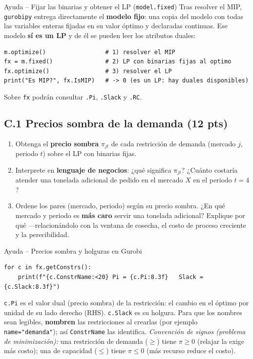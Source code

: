 \documentclass[12pt,a4paper]{article}
\begin{document}
\begin{ayuda}{Ayuda -- Fijar las binarias y obtener el LP (\texttt{model.fixed})}
\vspace{2pt}
Tras resolver el MIP, \texttt{gurobipy} entrega directamente el \textbf{modelo
fijo}: una copia del modelo con todas las variables enteras fijadas en su valor
óptimo y declaradas continuas. Ese modelo \textbf{sí es un LP} y de él se pueden
leer los atributos duales:
\begin{lstlisting}
m.optimize()                 # 1) resolver el MIP
fx = m.fixed()               # 2) LP con binarias fijas al optimo
fx.optimize()                # 3) resolver el LP
print("Es MIP?", fx.IsMIP)   # -> 0 (es un LP: hay duales disponibles)
\end{lstlisting}
Sobre \texttt{fx} podrán consultar \texttt{.Pi}, \texttt{.Slack} y \texttt{.RC}.
\end{ayuda}

\subsection*{C.1 \quad Precios sombra de la demanda \hfill\normalfont\normalsize(12 pts)}

\begin{enumerate}[label=\alph*), leftmargin=*, topsep=2pt]
    \item Obtenga el \textbf{precio sombra} $\pi_{jt}$ de cada restricción de
          demanda (mercado $j$, periodo $t$) sobre el LP con binarias fijas.
    \item Interprete en \textbf{lenguaje de negocios}: ¿qué significa $\pi_{jt}$?
          ¿Cuánto costaría atender una tonelada adicional de pedido en el mercado
          $X$ en el periodo $t=4$?
    \item Ordene los pares (mercado, periodo) según su precio sombra.
          ¿En qué mercado y periodo es \textbf{más caro} servir una tonelada
          adicional? Explique por qué —relacionándolo con la ventana de cosecha,
          el costo de proceso creciente y la perecibilidad.
\end{enumerate}

\begin{ayuda}{Ayuda -- Precios sombra y holguras en Gurobi}
\begin{lstlisting}
for c in fx.getConstrs():
    print(f"{c.ConstrName:<20} Pi = {c.Pi:8.3f}   Slack = {c.Slack:8.3f}")
\end{lstlisting}
\texttt{c.Pi} es el valor dual (precio sombra) de la restricción: el cambio en el
óptimo por unidad de su lado derecho (RHS). \texttt{c.Slack} es su holgura. Para
que los nombres sean legibles, \textbf{nombren} las restricciones al crearlas
(por ejemplo \texttt{name="demanda"}); así \texttt{ConstrName} las identifica.
\emph{Convención de signos (problema de minimización):} una restricción de
demanda ($\ge$) tiene $\pi\ge 0$ (relajar la exige más costo); una de capacidad
($\le$) tiene $\pi\le 0$ (más recurso reduce el costo).
\end{ayuda}
\end{document}
